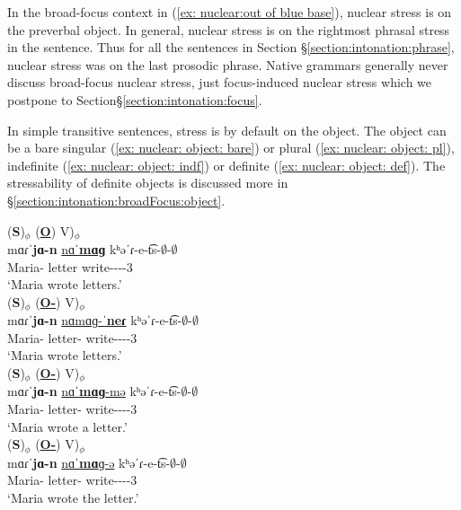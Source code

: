 In the broad-focus context in (\ref{ex: nuclear:out of blue base}), nuclear stress is on the preverbal object. In general, nuclear stress is on the rightmost phrasal stress in the sentence. Thus for all the sentences in Section \S\ref{section:intonation:phrase}, nuclear stress was on the last prosodic phrase. Native grammars generally never discuss broad-focus nuclear stress, just focus-induced nuclear stress \citep[23-4]{Abeghyan-1933-Meter} which we postpone to Section\S\ref{section:intonation:focus}. 





In simple transitive sentences, stress is by default on the object. The object can be a bare singular (\ref{ex: nuclear: object: bare}) or plural (\ref{ex: nuclear: object: pl}), indefinite (\ref{ex: nuclear: object: indf}) or definite (\ref{ex: nuclear: object: def}). The stressability of definite objects is discussed more in \S\ref{section:intonation:broadFocus:object}. 

\begin{exe}
	\ex \begin{xlist}
		\ex \glll (\textbf{S})$_\phi$ (\underline{\textbf{O}}) V)$_\phi$ \\
		mɑɾˈ\textbf{jɑ-n} \underline{nɑˈ\textbf{mɑɡ}} kʰəˈɾ-e-t͡s-$\emptyset$-$\emptyset$ \\
		Maria-{} letter write-{\thgloss}-{\aorperf}-{\pst}-3{\sg} \\
		\trans `Maria wrote letters.' \label{ex: nuclear: object: bare} 
		\\ 
		\ex \glll (\textbf{S})$_\phi$ (\underline{\textbf{O-{\pl}}}) V)$_\phi$ \\
		mɑɾˈ\textbf{jɑ-n} \underline{nɑmɑɡ-ˈ\textbf{neɾ}} kʰəˈɾ-e-t͡s-$\emptyset$-$\emptyset$ \\
		Maria-{} letter-{\pl} write-{\thgloss}-{\aorperf}-{\pst}-3{\sg} \\
		\trans `Maria wrote letters.' \label{ex: nuclear: object: pl} 
		\\ 
		\ex \glll (\textbf{S})$_\phi$ (\underline{\textbf{O-{\indf}}}) V)$_\phi$ \\
		mɑɾˈ\textbf{jɑ-n} \underline{nɑˈ\textbf{mɑɡ}-mə} kʰəˈɾ-e-t͡s-$\emptyset$-$\emptyset$ \\
		Maria-{} letter-{\pl} write-{\thgloss}-{\aorperf}-{\pst}-3{\sg} \\
		\trans `Maria wrote a letter.' \label{ex: nuclear: object: indf} 
		\\ 
		\ex \glll (\textbf{S})$_\phi$ (\underline{\textbf{O-{}}}) V)$_\phi$ \\
		mɑɾˈ\textbf{jɑ-n} \underline{nɑˈ\textbf{mɑ}ɡ-ə} kʰəˈɾ-e-t͡s-$\emptyset$-$\emptyset$ \\
		Maria-{} letter-{} write-{\thgloss}-{\aorperf}-{\pst}-3{\sg} \\
		\trans `Maria wrote the letter.' \label{ex: nuclear: object: def} 
		\\ 
	\end{xlist}
\end{exe}

